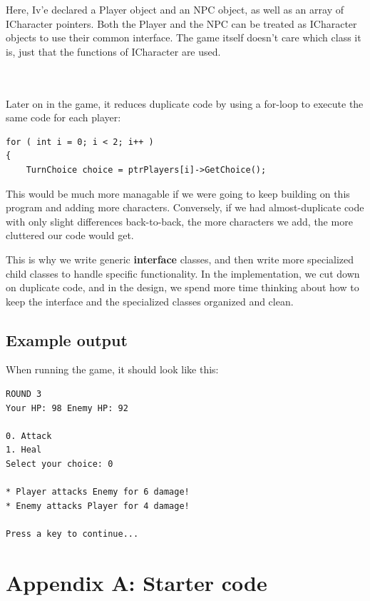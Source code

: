\documentclass[a4paper,12pt,oneside]{book}
\begin{document}
Here, Iv'e declared a Player object and an NPC object, as well
as an array of ICharacter pointers. Both the Player and the NPC can
be treated as ICharacter objects to use their common interface. The
game itself doesn't care which class it is, just that the functions
of ICharacter are used.

~\\~\\
Later on in the game, it reduces duplicate code by using a for-loop
to execute the same code for each player:

\begin{lstlisting}[style=code]
for ( int i = 0; i < 2; i++ )
{
    TurnChoice choice = ptrPlayers[i]->GetChoice();
\end{lstlisting}

This would be much more managable if we were going to keep building on
this program and adding more characters.
Conversely, if we had almost-duplicate code with only slight differences
back-to-back, the more characters we add, the more cluttered our code would get.

This is why we write generic \textbf{interface} classes, and then write
more specialized child classes to handle specific functionality.
In the implementation, we cut down on duplicate code, and in the design,
we spend more time thinking about how to keep the interface and the
specialized classes organized and clean.


\newpage
\subsection{Example output}

When running the game, it should look like this:

\begin{lstlisting}[style=output]
ROUND 3
Your HP: 98	Enemy HP: 92

0. Attack
1. Heal
Select your choice: 0

* Player attacks Enemy for 6 damage!
* Enemy attacks Player for 4 damage!

Press a key to continue...
\end{lstlisting}








    \newpage
    \section{Appendix A: Starter code}
\end{document}
